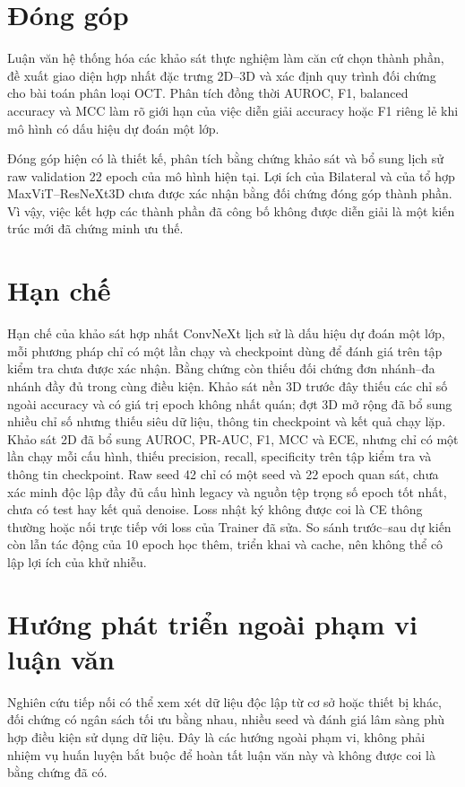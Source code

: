 \documentclass[14pt,a4paper,oneside]{extreport}
\begin{document}
\section{Đóng góp}
Luận văn hệ thống hóa các khảo sát thực nghiệm làm căn cứ chọn thành
phần, đề xuất giao diện hợp nhất đặc trưng 2D--3D và xác định quy trình
đối chứng cho bài toán phân loại OCT. Phân tích đồng thời AUROC, F1,
balanced accuracy và MCC làm rõ giới hạn của việc diễn giải accuracy
hoặc F1 riêng lẻ khi mô hình có dấu hiệu dự đoán một lớp.

Đóng góp hiện có là thiết kế, phân tích bằng chứng khảo sát và bổ sung
lịch sử raw validation 22 epoch của mô hình hiện tại. Lợi ích
của Bilateral và của tổ hợp MaxViT--ResNeXt3D chưa được xác nhận bằng
đối chứng đóng góp thành phần. Vì vậy, việc kết hợp các thành phần đã công bố
không được diễn giải là một kiến trúc mới đã chứng minh ưu thế.

\section{Hạn chế}
Hạn chế của khảo sát hợp nhất ConvNeXt lịch sử là dấu hiệu dự đoán một lớp,
mỗi phương pháp chỉ có một lần chạy và checkpoint dùng để đánh giá trên tập kiểm tra
chưa được xác nhận. Bằng chứng còn thiếu đối chứng đơn nhánh--đa nhánh đầy đủ
trong cùng điều kiện. Khảo sát nền 3D trước đây thiếu các chỉ số ngoài accuracy
và có giá trị epoch không nhất quán; đợt 3D mở rộng đã bổ sung nhiều chỉ số
nhưng thiếu siêu dữ liệu, thông tin checkpoint và kết quả chạy lặp.
Khảo sát 2D đã bổ sung AUROC, PR-AUC, F1, MCC và ECE, nhưng chỉ có một
lần chạy mỗi cấu hình, thiếu precision, recall, specificity trên tập kiểm tra
và thông tin checkpoint.
Raw seed 42 chỉ có một seed và 22 epoch quan sát, chưa xác minh độc
lập đầy đủ cấu hình legacy và nguồn tệp trọng số epoch tốt nhất,
chưa có test hay kết quả denoise. Loss nhật ký không được coi là CE
thông thường hoặc nối trực tiếp với loss của Trainer đã sửa. So sánh
trước--sau dự kiến còn lẫn tác động của 10 epoch học thêm, triển khai
và cache, nên không thể cô lập lợi ích của khử nhiễu.

\section{Hướng phát triển ngoài phạm vi luận văn}
Nghiên cứu tiếp nối có thể xem xét dữ liệu độc lập từ cơ sở hoặc
thiết bị khác, đối chứng có ngân sách tối ưu bằng nhau, nhiều seed
và đánh giá lâm sàng phù hợp điều kiện sử dụng dữ liệu. Đây là các
hướng ngoài phạm vi, không phải nhiệm vụ huấn luyện bắt buộc để
hoàn tất luận văn này và không được coi là bằng chứng đã có.
\end{document}
